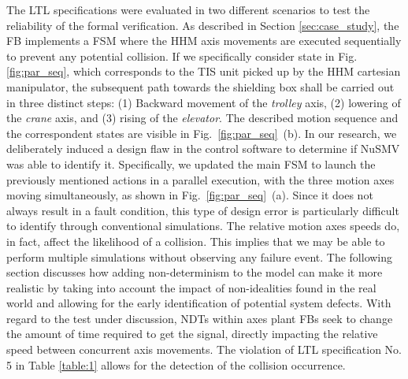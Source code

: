 \documentclass{ieeeojies}
\begin{document}
The LTL specifications were evaluated in two different scenarios to test the reliability of the formal verification. 
As described in Section \ref{sec:case_study}, the  FB implements a FSM where the HHM axis movements are executed sequentially to prevent any potential collision. 
If we specifically consider state  in Fig. \ref{fig:par_seq}, which corresponds to the TIS unit picked up by the HHM cartesian manipulator, the subsequent path towards the shielding box shall be carried out in three distinct steps: (1) Backward movement of the \textit{trolley} axis, (2) lowering of the \textit{crane} axis, and (3) rising of the \textit{elevator}. The described motion sequence and the correspondent states are visible in \mbox{Fig. \ref{fig:par_seq} (b)}.
In our research, we deliberately induced a design flaw in the control software to determine if NuSMV was able to identify it. 
Specifically, we updated the main FSM to launch the previously mentioned actions in a parallel execution, with the three motion axes moving simultaneously, as shown in \mbox{Fig. \ref{fig:par_seq} (a)}. 
Since it does not always result in a fault condition, this type of design error is particularly difficult to identify through conventional simulations. 
The relative motion axes speeds do, in fact, affect the likelihood of a collision. This implies that we may be able to perform multiple simulations without observing any failure event. The following section discusses how adding non-determinism to the model can make it more realistic by taking into account the impact of non-idealities found in the real world and allowing for the early identification of potential system defects.
With regard to the test under discussion, NDTs within axes plant FBs seek to change the amount of time required to get the  signal, directly impacting the relative speed between concurrent axis movements.
The violation of LTL specification No. 5 in Table \ref{table:1} allows for the detection of the collision occurrence. 
\end{document}
